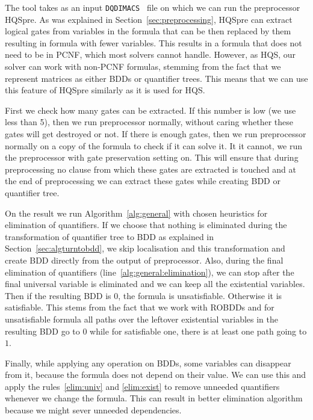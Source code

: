 \documentclass[
  digital, %
  color,
  twoside, %
  table,   %
  nolof,     %
  nolot,     %
]{fithesis3}
\theoremstyle{definition}
\theoremstyle{remark}
\newcommand{\DQDIMACS}[0]{\texttt{DQDIMACS}}
\begin{document}
The tool takes as an input \DQDIMACS{}~\cite{iDQandDQDIMACS} file on which we can run the preprocessor HQSpre. As was explained in Section~\ref{sec:preprocessing}, HQSpre can extract logical gates from variables in the formula that can be then replaced by them resulting in formula with fewer variables. This results in a formula that does not need to be in PCNF, which most solvers cannot handle. However, as HQS, our solver can work with non-PCNF formulas, stemming from the fact that we represent matrices as either BDDs or quantifier trees. This means that we can use this feature of HQSpre similarly as it is used for HQS.

First we check how many gates can be extracted. If this number is low (we use less than 5), then we run preprocessor normally, without caring whether these gates will get destroyed or not. If there is enough gates, then we run preprocessor normally on a copy of the formula to check if it can solve it. It it cannot, we run the preprocessor with gate preservation setting on. This will ensure that during preprocessing no clause from which these gates are extracted is touched and at the end of preprocessing we can extract these gates while creating BDD or quantifier tree.

On the result we run Algorithm~\ref{alg:general} with chosen heuristics for elimination of quantifiers. If we choose that nothing is eliminated during the transformation of quantifier tree to BDD as explained in Section~\ref{sec:algturntobdd}, we skip localisation and this transformation and create BDD directly from the output of preprocessor. Also, during the final elimination of quantifiers (line~\ref{alg:general:elimination}), we can stop after the final universal variable is eliminated and we can keep all the existential variables. Then if the resulting BDD is $0$, the formula is unsatisfiable. Otherwise it is satisfiable. This stems from the fact that we work with ROBDDs and for unsatisfiable formula all paths over the leftover existential variables in the resulting BDD go to $0$ while for satisfiable one, there is at least one path going to $1$.

Finally, while applying any operation on BDDs, some variables can disappear from it, because the formula does not depend on their value. We can use this and apply the rules~\eqref{elim:univ} and \eqref{elim:exist} to remove unneeded quantifiers whenever we change the formula. This can result in better elimination algorithm because we might sever unneeded dependencies.
\end{document}
